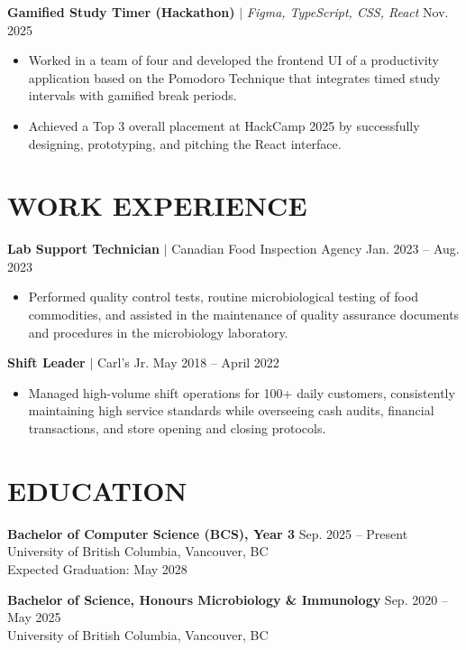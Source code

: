 \documentclass[letterpaper,11pt]{article}
\begin{document}
\vspace{4pt}
\noindent\textbf{Gamified Study Timer (Hackathon)} $|$ \textit{Figma, TypeScript, CSS, React} \hfill Nov. 2025
\begin{itemize}
    \item Worked in a team of four and developed the frontend UI of a productivity application based on the Pomodoro Technique that integrates timed study intervals with gamified break periods.
    \item Achieved a Top 3 overall placement at HackCamp 2025 by successfully designing, prototyping, and pitching the React interface.
\end{itemize}

\section*{WORK EXPERIENCE}

\noindent\textbf{Lab Support Technician} $|$ Canadian Food Inspection Agency \hfill Jan. 2023 -- Aug. 2023
\begin{itemize}
    \item Performed quality control tests, routine microbiological testing of food commodities, and assisted in the maintenance of quality assurance documents and procedures in the microbiology laboratory.
\end{itemize}

\vspace{4pt}
\noindent\textbf{Shift Leader} $|$ Carl's Jr. \hfill May 2018 -- April 2022
\begin{itemize}
    \item Managed high-volume shift operations for 100+ daily customers, consistently maintaining high service standards while overseeing cash audits, financial transactions, and store opening and closing protocols.
\end{itemize}

\section*{EDUCATION}

\noindent\textbf{Bachelor of Computer Science (BCS), Year 3} \hfill Sep. 2025 -- Present \\
University of British Columbia, Vancouver, BC \\
Expected Graduation: May 2028

\vspace{4pt}
\noindent\textbf{Bachelor of Science, Honours Microbiology \& Immunology} \hfill Sep. 2020 -- May 2025 \\
University of British Columbia, Vancouver, BC
\end{document}
